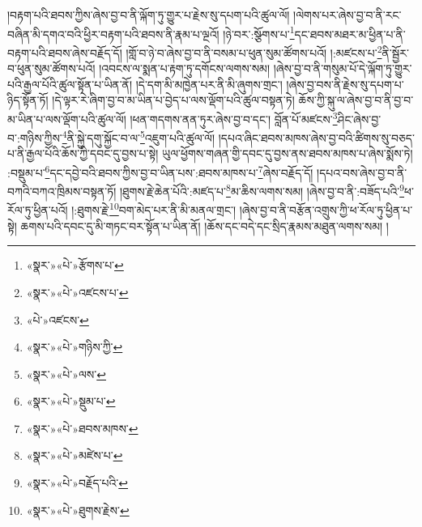 །བརྟག་པའི་ཐབས་ཀྱིས་ཞེས་བྱ་བ་ནི་ལྐོག་ཏུ་གྱུར་པ་རྗེས་སུ་དཔག་པའི་ཚུལ་ལོ། །ལེགས་པར་ཞེས་བྱ་བ་ནི་རང་བཞིན་མི་དགའ་བའི་ཕྱིར་བརྟག་པའི་ཐབས་ནི་རྣམ་པ་ལྔའོ། །ཉེ་བར་:སྩོགས་པ་\footnote{«སྣར་»«པེ་»རྩོགས་པ་}དང་ཐབས་མཐར་མ་ཕྱིན་པ་ནི་བརྟག་པའི་ཐབས་ཞེས་བརྗོད་དོ། །གློ་བ་ཉེ་བ་ཞེས་བྱ་བ་ནི་བསམ་པ་ཕུན་སུམ་ཚོགས་པའོ། །:མཛངས་པ་\footnote{«སྣར་»«པེ་»འཛངས་པ་}ནི་སྦྱོར་བ་ཕུན་སུམ་ཚོགས་པའོ། །འབངས་ལ་སྨན་པ་རྟག་ཏུ་དགོངས་ལགས་སམ། །ཞེས་བྱ་བ་ནི་གསུམ་པོ་དེ་ལྐོག་ཏུ་གྱུར་པའི་རྒྱལ་པོའི་ཚུལ་སྟོན་པ་ཡིན་ནོ། །དེ་དག་མི་མཁྱེན་པར་ནི་མི་ཞུགས་གྲང་། །ཞེས་བྱ་བས་ནི་རྗེས་སུ་དཔག་པ་ཉིད་སྟོན་ཏོ། །དེ་ལྟར་རེ་ཞིག་བྱ་བ་མ་ཡིན་པ་བྱེད་པ་ལས་ལྡོག་པའི་ཚུལ་བསྟན་ཏེ། ཆོས་ཀྱི་སྐུ་ལ་ཞེས་བྱ་བ་ནི་བྱ་བ་མ་ཡིན་པ་ལས་ལྡོག་པའི་ཚུལ་ལོ། །ཕན་གདགས་ནན་ཏུར་ཞེས་བྱ་བ་དང་། བློན་པོ་མཛངས་\footnote{«པེ་»འཛངས་}ཤིང་ཞེས་བྱ་བ་:གཉིས་ཀྱིས་\footnote{«སྣར་»«པེ་»གཉིས་ཀྱི་}ནི་སྐྱེ་དགུ་སྐྱོང་བ་ལ་\footnote{«སྣར་»«པེ་»ལས་}འཇུག་པའི་ཚུལ་ལོ། །དཔའ་ཞིང་ཐབས་མཁས་ཞེས་བྱ་བའི་ཚིགས་སུ་བཅད་པ་ནི་རྒྱལ་པོའི་ཆོས་ཀྱི་དབང་དུ་བྱས་པ་སྟེ། ཡུལ་ཕྱོགས་གཞན་གྱི་དབང་དུ་བྱས་ནས་ཐབས་མཁས་པ་ཞེས་སྨོས་ཏེ། :བསྡུམ་པ་\footnote{«སྣར་»«པེ་»སྡུམ་པ་}དང་དབྱེ་བའི་ཐབས་ཀྱིས་བྱ་བ་ཡིན་པས་:ཐབས་མཁས་པ་\footnote{«སྣར་»«པེ་»ཐབས་མཁས་}ཞེས་བརྗོད་དོ། །དཔའ་བས་ཞེས་བྱ་བ་ནི་བཀའི་བཀའ་ཁྲིམས་བསྟན་ཏོ། །ཐུགས་རྗེ་ཆེན་པོའི་:མཛད་པ་\footnote{«སྣར་»«པེ་»མཛེས་པ་}མ་ཆིས་ལགས་སམ། །ཞེས་བྱ་བ་ནི་:བཟོད་པའི་\footnote{«སྣར་»«པེ་»བརྗོད་པའི་}ཕ་རོལ་ཏུ་ཕྱིན་པའོ། །:ཐུགས་རྗེ་\footnote{«སྣར་»«པེ་»ཐུགས་རྗེས་}བག་མེད་པར་ནི་མི་མནལ་གྲང་། །ཞེས་བྱ་བ་ནི་བརྩོན་འགྲུས་ཀྱི་ཕ་རོལ་ཏུ་ཕྱིན་པ་སྟེ། ཆགས་པའི་དབང་དུ་མི་གཏང་བར་སྟོན་པ་ཡིན་ནོ། །ཆོས་དང་བདེ་དང་སྲིད་རྣམས་མཐུན་ལགས་སམ། །
